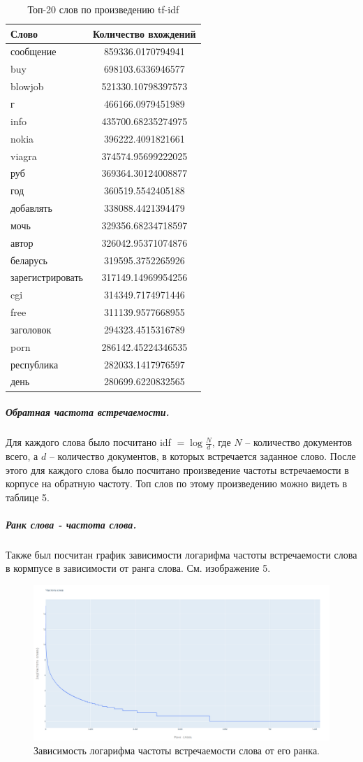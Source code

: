 \begin{table}
	\begin{center}
		\begin{tabular}{|l|c|}
			\hline
			Слово & Количество вхождений\\
			\hline
			сообщение &859336.0170794941\\
			buy &698103.6336946577\\
			blowjob &521330.10798397573\\
			г &466166.0979451989\\
			info &435700.68235274975\\
			nokia &396222.4091821661\\
			viagra &374574.95699222025\\
			руб &369364.30124008877\\
			год &360519.5542405188\\
			добавлять &338088.4421394479\\
			мочь &329356.68234718597\\
			автор &326042.95371074876\\
			беларусь &319595.3752265926\\
			зарегистрировать &317149.14969954256\\
			cgi &314349.7174971446\\
			free &311139.9577668955\\
			заголовок &294323.4515316789\\
			porn &286142.45224346535\\
			республика &282033.1417976597\\
			день &280699.6220832565\\
			\hline
		\end{tabular}
	\end{center}
	\caption{Топ-20 слов по произведению tf-idf}
\end{table}

\subparagraph{Обратная частота встречаемости.}
	Для каждого слова было посчитано idf $ = \log \frac{N}{d}$, где $N$ -- количество документов всего, а $d$ -- количество документов, в которых встречается заданное слово. После этого для каждого слова было посчитано произведение частоты встречаемости в корпусе на обратную частоту. Топ слов по этому произведению можно видеть в таблице 5. 

\subparagraph{Ранк слова - частота слова.}

Также был посчитан график зависимости логарифма частоты встречаемости слова в кормпусе в зависимости от ранга слова. См. изображение 5. 


\begin{figure}
	\includegraphics[width=.5\textwidth]{rank_to_frequency.png}
	\caption{Зависимость логарифма частоты встречаемости слова от его ранка.}
\end{figure}